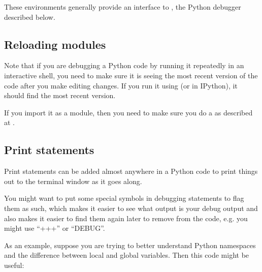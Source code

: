 \documentclass[letterpaper,10pt,english]{sphinxmanual}
\begin{document}
These environments generally provide an interface to , the Python
debugger described below.


\subsection{Reloading modules}
\label{python_debugging:reloading-modules}
Note that if you are debugging a Python code by running it repeatedly in an
interactive shell, you need to make sure it is seeing the most recent
version of the code after you make editing changes.  If you run it using
 (or  in IPython), it should find the most recent version.

If you import it as a module, then you need to make sure you do a 
as described at {\hyperref[python_scripts_modules:python\string-reload]{}}.


\subsection{Print statements}
\label{python_debugging:print-statements}
Print statements can be added almost anywhere in a Python code to print
things out to the terminal window as it goes along.

You might want to put some special symbols in debugging statements to flag
them as such, which makes it easier to see what output is your debug output
and also makes it easier to find them again later to remove from the code,
e.g. you might use ``+++'' or ``DEBUG''.

As an example, suppose you are trying to better understand Python namespaces
and the difference between local and global variables.  Then this code might
be useful:
\end{document}
